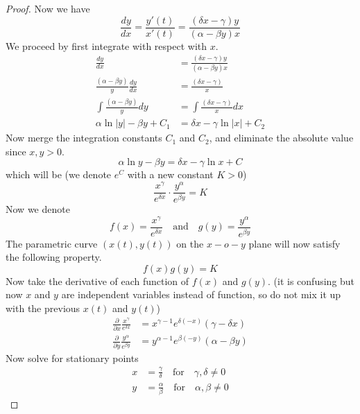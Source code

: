 \documentclass{article}
\begin{document}
\begin{proof}
Now we have
$$
\frac{dy}{dx}=\frac{y'(t)}{x'(t)}=\frac{(\delta x-\gamma)y}{(\alpha-\beta y)x}
$$
We proceed by first integrate with respect with $x$.
\begin{align*}
\frac{dy}{dx}&=\frac{(\delta x-\gamma)y}{(\alpha-\beta y)x}\\
\frac{(\alpha-\beta y)}{y}\frac{dy}{dx}&=\frac{(\delta x-\gamma)}{x}\\
\int\frac{(\alpha-\beta y)}{y}dy&=\int\frac{(\delta x-\gamma)}{x}dx\\
\alpha\ln\lvert y\rvert-\beta y+C_1&=\delta x-\gamma\ln\lvert x\rvert+C_2
\end{align*}
Now merge the integration constants $C_1$ and $C_2$, and eliminate the absolute value since $x,y>0$.
$$
\alpha\ln y-\beta y=\delta x-\gamma\ln x+C
$$
which will be (we denote $e^C$ with a new constant $K>0$)
$$
\frac{x^\gamma}{e^{\delta x}}\cdot\frac{y^\alpha}{e^{\beta y}}=K
$$
Now we denote
$$
f(x)=\frac{x^\gamma}{e^{\delta x}}\mathrm{\quad and\quad}g(y)=\frac{y^\alpha}{e^{\beta y}}
$$
The parametric curve $(x(t),y(t))$ on the $x-o-y$ plane will now satisfy the following property.
$$
f(x)g(y)=K
$$
Now take the derivative of each function of $f(x)$ and $g(y)$. (it is confusing but now $x$ and $y$ are independent variables instead of function, so do not mix it up with the previous $x(t)$ and $y(t)$)
\begin{align*}
\frac{\partial}{\partial x}\frac{x^{\gamma }}{e^{\delta  x}}&=x^{\gamma -1} e^{\delta  (-x)} (\gamma -\delta  x)\\
\frac{\partial}{\partial y}\frac{y^\alpha}{e^{\beta  y}}&=y^{\alpha-1} e^{\beta  (-y)} (\alpha-\beta  y)
\end{align*}
Now solve for stationary points
\begin{align*}
x&=\frac{\gamma}{\delta}\mathrm{\quad for\quad}\gamma,\delta\neq0\\
y&=\frac{\alpha}{\beta}\mathrm{\quad for\quad}\alpha,\beta\neq0
\end{align*}


\end{proof}
\end{document}
